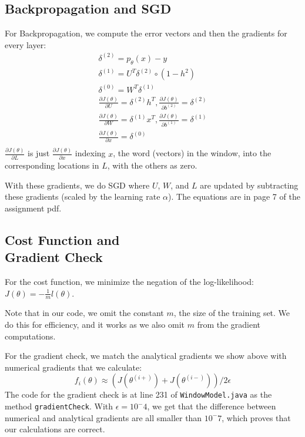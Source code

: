 \documentclass[12pt, twocolumn]{article}
\begin{document}
\subsection{Backpropagation and SGD}
For Backpropagation, we compute the error vectors and then the gradients for every layer:
\begin{gather*}
\delta^{(2)} = p_\theta(x) - y\\
\delta^{(1)} = U^T\delta^{(2)}\circ(1-h^2)\\
\delta^{(0)} = W^T\delta^{(1)}\\
\frac{\partial J(\theta)}{\partial U} = \delta^{(2)}h^T, \frac{\partial J(\theta)}{\partial b^{(2)}} = \delta^{(2)}\\
\frac{\partial J(\theta)}{\partial W} = \delta^{(1)}x^T, \frac{\partial J(\theta)}{\partial b^{(1)}} = \delta^{(1)}\\
\frac{\partial J(\theta)}{\partial x} = \delta^{(0)}\\
\end{gather*}
$\frac{\partial J(\theta)}{\partial L}$ is just $\frac{\partial J(\theta)}{\partial x}$ indexing $x$, the word (vectors) in the window, into the corresponding locations in $L$, with the others as zero.

With these gradients, we do SGD where $U$, $W$, and $L$ are updated by subtracting these gradients (scaled by the learning rate $\alpha$). The equations are in page 7 of the assignment pdf.
\subsection{Cost Function and\\Gradient Check}
For the cost function, we minimize the negation of the log-likelihood: $J(\theta)=-\frac{1}{m}l(\theta)$.

Note that in our code, we omit the constant $m$, the size of the training set. We do this for efficiency, and it works as we also omit $m$ from the gradient computations.

For the gradient check, we match the analytical gradients we show above with numerical gradients that we calculate:
\begin{equation*}
f_i(\theta)\approx(J(\theta^{(i+)}) + J(\theta^{(i-)}))/2\epsilon
\end{equation*}
The code for the gradient check is at line 231 of \texttt{WindowModel.java} as the method \texttt{gradientCheck}. With $\epsilon=10^-4$, we get that the difference between numerical and analytical gradients are all smaller than $10^-7$, which proves that our calculations are correct.
\end{document}
